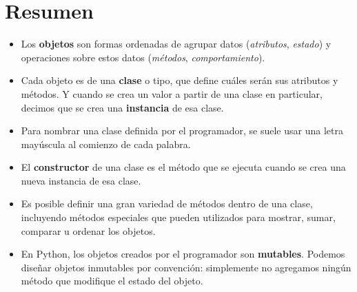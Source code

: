 \section{Resumen}

\begin{itemize}
\item Los {\bf objetos} son formas ordenadas de agrupar datos
(\emph{atributos}, \emph{estado}) y operaciones sobre estos datos
(\emph{métodos}, \emph{comportamiento}).

\item Cada objeto es de una {\bf clase} o tipo, que define cuáles
serán sus atributos y métodos. Y cuando se crea un valor a partir de una
clase en particular, decimos que se crea una {\bf instancia} de esa clase.

\item Para nombrar una clase definida por el programador, se suele usar una letra
mayúscula al comienzo de cada palabra.

\item El {\bf constructor} de una clase es el método que se ejecuta cuando
se crea una nueva instancia de esa clase.

\item Es posible definir una gran variedad de métodos dentro de una
clase, incluyendo métodos especiales que pueden utilizados para
mostrar, sumar, comparar u ordenar los objetos.

\item En Python, los objetos creados por el programador son {\bf mutables}.
Podemos diseñar objetos inmutables por convención: simplemente no agregamos
ningún método que modifique el estado del objeto.
\end{itemize}

